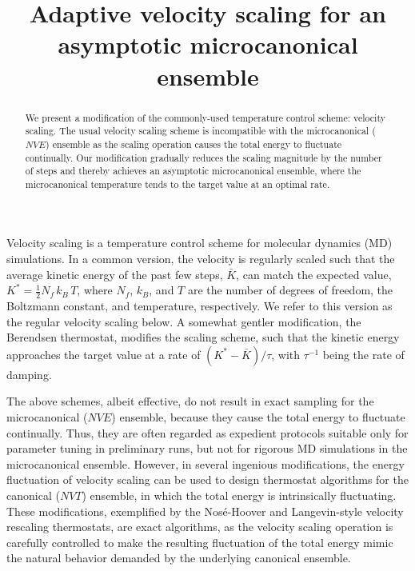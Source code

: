 \documentclass[reprint]{revtex4-1}
\begin{document}
\title{Adaptive velocity scaling for an asymptotic
microcanonical ensemble}
\author{}
\begin{abstract}
  We present a modification of the commonly-used
  temperature control scheme: velocity scaling.
  The usual velocity scaling scheme is incompatible with
  the microcanonical ($NVE$) ensemble
  as the scaling operation causes the total energy to fluctuate continually.
  Our modification gradually reduces the scaling magnitude
  by the number of steps
  and thereby achieves an asymptotic microcanonical ensemble,
  where the microcanonical temperature tends to the target value
  at an optimal rate.
\end{abstract}

\maketitle



Velocity scaling is a temperature control scheme
for molecular dynamics (MD) simulations.
%
In a common version,
the velocity is regularly scaled such that the average
kinetic energy of the past few steps, $\bar K$,
can match the expected value,
$K^* = \frac{1}{2} N_f \, k_B \, T$\cite{frenkel},
where $N_f$, $k_B$, and $T$ are the number of degrees of freedom,
the Boltzmann constant, and temperature, respectively.
%
We refer to this version as the regular velocity scaling below.
%
A somewhat gentler modification, the Berendsen thermostat\cite{berendsen1984},
modifies the scaling scheme, such that
the kinetic energy approaches the target value at a rate of
$\left( K^* - \bar K \right)/\tau$,
with $\tau^{-1}$ being the rate of damping.

The above schemes, albeit effective,
do not result in exact sampling for the microcanonical ($NVE$) ensemble\cite{hermansson1988},
because they cause the total energy to fluctuate continually.
%
Thus, they are often regarded as expedient protocols
suitable only for parameter tuning in preliminary runs,
but not for rigorous MD simulations in the microcanonical ensemble.
%
However, in several ingenious modifications,
the energy fluctuation of velocity scaling
can be used to design thermostat algorithms
for the canonical ($NVT$) ensemble, in which the total energy
is intrinsically fluctuating.
%
These modifications,
exemplified by the Nos\'e-Hoover\cite{nose1984, nose1984mp, hoover1985, martyna1992}
and Langevin-style velocity rescaling\cite{bussi2007} thermostats,
are exact algorithms, as
the velocity scaling operation is carefully
controlled to make
the resulting fluctuation of the total energy
mimic the natural behavior demanded by the underlying canonical ensemble.
%
\end{document}
